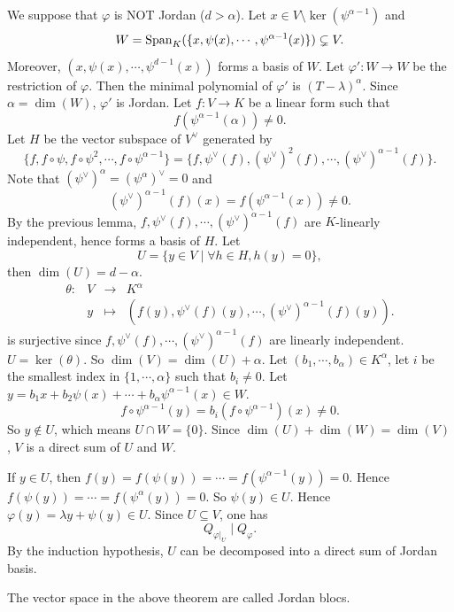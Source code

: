 \begin{proofenv}
    \quad We suppose that $\varphi$ is NOT Jordan ($d > \alpha$).
    Let $x \in V \setminus \ker(\psi^{\alpha - 1})$ and 
    $$W = \operatorname{\mathrm{Span}}_{K}(\{x,\psi(x),\cdots,\psi^{\alpha - 1}(x)\}) \subsetneq V.$$
    Moreover, $(x,\psi(x),\cdots,\psi^{d-1}(x))$ forms a basis of $W$.
    Let $\varphi':W\rightarrow W$ be the restriction of $\varphi$.
    Then the minimal polynomial of $\varphi'$ is $(T - \lambda)^\alpha$.
    Since $\alpha = \dim(W)$, $\varphi'$ is Jordan.
    Let $f: V \rightarrow K$ be a linear form such that
    $$f(\psi^{\alpha - 1}(\alpha)) \neq 0.$$
    Let $H$ be the vector subspace of $V^\vee$ generated by 
    $$\{f,f\circ \psi , f \circ \psi^2 ,\cdots, f \circ \psi^{\alpha - 1}\} = \{f, \psi^\vee (f), (\psi^\vee)^2 (f),\cdots, (\psi^\vee)^{\alpha - 1}(f)\}.$$
    Note that $(\psi^\vee)^\alpha = (\psi^\alpha)^\vee = 0$ and 
    $$(\psi^\vee)^{\alpha - 1}(f)(x) = f(\psi^{\alpha-1}(x)) \neq 0.$$
    By the previous lemma, $f,\psi^\vee(f),\cdots,(\psi^\vee)^{\alpha - 1}(f)$ are $K$-linearly independent,
    hence forms a basis of $H$.
    Let
    $$U = \{y \in V \mid \forall h \in H, h(y) = 0\},$$
    then $\dim(U) = d - \alpha$.
    $$\begin{array}{rrcl}
        \theta : & V & \longrightarrow & K^\alpha\\
        & y & \longmapsto & (f(y), \psi^\vee(f)(y), \cdots, (\psi^\vee)^{\alpha - 1}(f)(y)).
    \end{array}$$
    is surjective since $f, \psi^\vee(f), \cdots, (\psi^\vee)^{\alpha - 1}(f)$ are linearly independent.
    $U = \ker(\theta)$.
    So $\dim(V) = \dim(U) + \alpha$.
    Let $(b_1,\cdots,b_\alpha) \in K^\alpha$, let $i$ be the smallest index in $\{1,\cdots,\alpha\}$ such that $b_i \neq 0$.
    Let $y = b_1 x + b_2 \psi(x) + \cdots + b_{\alpha}\psi^{\alpha-1}(x) \in W$.
    $$f \circ \psi^{\alpha - 1}(y) = b_i (f \circ \psi^{\alpha - 1})(x) \neq 0.$$
    So $y \notin U$, which means $U \cap W = \{0\}$.
    Since $\dim(U) + \dim (W) = \dim (V)$, $V$ is a direct sum of $U$ and $W$.

    If $y \in U$, then $f(y) = f(\psi(y)) = \cdots = f (\psi^{\alpha - 1}(y)) = 0$.
    Hence $f(\psi(y)) = \cdots = f (\psi^{\alpha}(y)) = 0$.
    So $\psi(y) \in U$.
    Hence $\varphi(y) = \lambda y + \psi(y) \in U$.
    Since $U \subseteq V$, one has
    $$Q_{\varphi|_{U}} \mid Q_{\varphi}.$$
    By the induction hypothesis, $U$ can be decomposed into a direct sum of Jordan basis.
\end{proofenv}

\begin{definitionenv}
    The vector space in the above theorem are called Jordan blocs.
\end{definitionenv}

